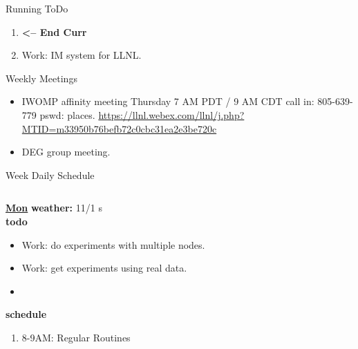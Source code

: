 \begin{columns}
\begin{column}{0.6\linewidth}
\begin{block}{Running ToDo}
\begin{enumerate}
 \item \tiny \textbf{ <-- End Curr } 
   
 \item \tiny Work: IM system for LLNL.
        \end{enumerate}
      \end{block}
      
      \begin{block}{Weekly Meetings}
        \begin{itemize}
          \tiny \item \tiny IWOMP affinity meeting Thursday 7 AM PDT / 9 AM
          CDT call in: 805-639-779 pswd: places. \url{https://llnl.webex.com/llnl/j.php?MTID=m33950b76befb72c0cbc31ea2e3be720c}
        \item \tiny DEG group meeting.  
        \end{itemize}
      \end{block} 
      \begin{block}{Week Daily Schedule}
        \begin{columns}
          \begin{column}{0.14\textwidth}{\small \underline{\bf Mon}}
            {\tiny \bf {\tiny weather:} } {\tiny 11/1 s} \\ 
            {\tiny \bf {\tiny todo}}\\ 
            \begin{itemize}
              \tiny \item \tiny Work: do experiments with multiple nodes. 
            \item \tiny Work: get experiments using real data.  
            \item \tiny 
            \end{itemize}
                {\small  \bf schedule}\\
                \begin{enumerate} 
                  \tiny \item \tiny 8-9AM: Regular Routines 
                \end{enumerate}
          \end{column}


\end{columns}
\end{block}
\end{column}
\end{columns}
